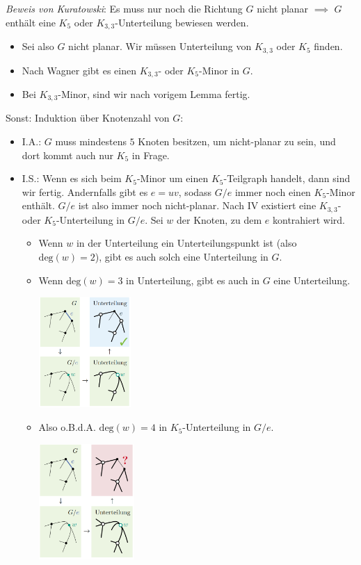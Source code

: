 \textit{Beweis von Kuratowski}: Es muss nur noch die Richtung $G$ nicht planar $\implies$ $G$ enthält eine $K_5$ oder $K_{3,3}$-Unterteilung bewiesen werden.
\begin{itemize}
	\item Sei also $G$ nicht planar. Wir müssen Unterteilung von $K_{3,3}$ oder $K_5$ finden.
	\item Nach Wagner gibt es einen $K_{3,3}$- oder $K_5$-Minor in $G$.
	\item Bei $K_{3,3}$-Minor, sind wir nach vorigem Lemma fertig.
\end{itemize}
Sonst: Induktion über Knotenzahl von $G$:
\begin{itemize}
	\item I.A.: $G$ muss mindestens $5$ Knoten besitzen, um nicht-planar zu sein, und dort kommt auch nur $K_5$ in Frage.
	\item I.S.: Wenn es sich beim $K_5$-Minor um einen $K_5$-Teilgraph handelt, dann sind wir fertig. Andernfalls gibt es $e = uv$, sodass $G / e$ immer noch einen $K_5$-Minor enthält. $G/e$ ist also immer noch nicht-planar. Nach IV existiert eine $K_{3,3}$- oder $K_5$-Unterteilung in $G/ e$. Sei $w$ der Knoten, zu dem $e$ kontrahiert wird. 
	\begin{itemize}
		\item Wenn $w$ in der Unterteilung ein Unterteilungspunkt ist (also $\text{deg}(w)=2$), gibt es auch solch eine Unterteilung in $G$.
		\item Wenn $\text{deg}(w)=3$ in Unterteilung, gibt es auch in $G$ eine Unterteilung.
		\begin{center}
			\includegraphics[width=0.29\textwidth]{images/kuratowski-1.png}
		\end{center}
	\item Also o.B.d.A. $\text{deg}(w)=4$ in $K_5$-Unterteilung in $G/e$.
	\begin{center}
		\includegraphics[width=0.3\textwidth]{images/kuratowski-2.png}

\end{center}
\end{itemize}
\end{itemize}
